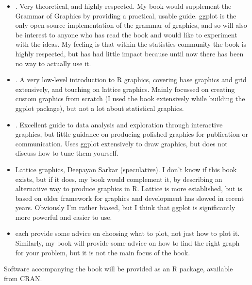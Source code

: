 \documentclass[oneside,letterpaper]{scrartcl}
\begin{document}
\begin{itemize}
  \item \citet{wilkinson:2006}.  Very theoretical, and highly respected.  My book would supplement the Grammar of Graphics by providing a practical, usable guide.  ggplot is the only open-source implementation of the grammar of graphics, and so will also be interest to anyone who has read the book and would like to experiment with the ideas.  My feeling is that within the statistics community the book is highly respected, but has had little impact because until now there has been no way to actually use it.
  
  \item \citet{murrell:2005}.  A very low-level introduction to R graphics, covering base graphics and grid extensively, and touching on lattice graphics.  Mainly focussed on creating custom graphics from scratch (I used the book extensively while building the ggplot package), but not a lot about statistical graphics.

  \item \citet{cook:2007}.  Excellent guide to data analysis and exploration through interactive graphics, but little guidance on producing polished graphics for publication or communication.  Uses ggplot extensively to draw graphics, but does not discuss how to tune them yourself.

  \item Lattice graphics, Deepayan Sarkar (speculative). I don't know if this book exists, but if it does, my book would complement it, by describing an alternative way to produce graphics in R.  Lattice is more established, but is based on older framework for graphics \citep{cleveland:1994} and development has slowed in recent years.  Obviously I'm rather biased, but I think that ggplot is significantly more powerful and easier to use.
  
  \item \citet{chambers:1983,cleveland:1993,cleveland:1994,robbins:2004} each provide some advice on choosing what to plot, not just how to plot it.  Similarly, my book will provide some advice on how to find the right graph for your problem, but it is not the main focus of the book. 
  
\end{itemize}

Software accompanying the book will be provided as an R package, available from CRAN.  

% 
\end{document}
